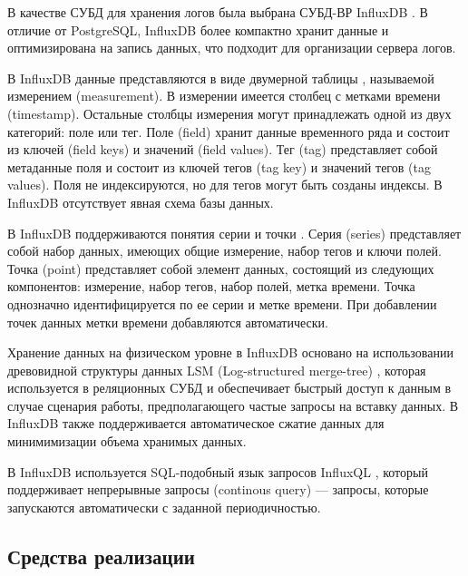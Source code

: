 В качестве СУБД для хранения логов была выбрана СУБД-ВР InfluxDB \cite{InfluxDB}. В отличие от PostgreSQL, InfluxDB более компактно хранит данные и оптимизирована на запись данных, что подходит для организации сервера логов.


В InfluxDB данные представляются в виде двумерной таблицы \cite{time_series}, называемой измерением (measurement). В измерении имеется столбец с метками времени (timestamp). Остальные столбцы измерения могут принадлежать одной из двух категорий: поле или тег. Поле (field) хранит данные временного ряда и состоит из ключей (field keys) и значений (field values). Тег (tag) представляет собой метаданные поля и состоит из ключей тегов (tag key) и значений тегов (tag values). Поля не индексируются, но для тегов могут быть созданы индексы. В InfluxDB отсутствует явная схема базы данных.

В InfluxDB поддерживаются понятия серии и точки \cite{time_series}. Серия (series) представляет собой набор данных, имеющих общие измерение, набор тегов и ключи полей. Точка (point) представляет собой элемент данных, состоящий из следующих компонентов: измерение, набор тегов, набор полей, метка времени. Точка однозначно идентифицируется по ее серии и метке времени. При добавлении точек данных метки времени добавляются автоматически.

Хранение данных на физическом уровне в InfluxDB основано на использовании древовидной структуры данных LSM (Log-structured merge-tree) \cite{log_tree}, которая используется в реляционных СУБД и обеспечивает быстрый доступ к данным в случае сценария работы, предполагающего частые запросы на вставку данных. В InfluxDB также поддерживается автоматическое сжатие данных для минимимизации объема хранимых данных. \cite{time_series}

В InfluxDB используется SQL-подобный язык запросов InfluxQL \cite{InfluxQL}, который поддерживает непрерывные запросы (continous query) --- запросы, которые запускаются автоматически с заданной периодичностью.



\subsection{Средства реализации}

